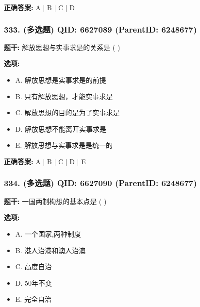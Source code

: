 \documentclass[12pt,UTF8]{ctexart}
\begin{document}
\textbf{正确答案:}
A | B | C | D

\vspace{0.3em}\hrulefill\vspace{0.7em}

\subsubsection*{333. (多选题) \small QID: 6627089 (ParentID: 6248677)}

\textbf{题干:}
解放思想与实事求是的关系是 ( )



\textbf{选项:}
\begin{itemize}[leftmargin=*]

  \item A. 解放思想是实事求是的前提

  \item B. 只有解放思想，才能实事求是

  \item C. 解放思想的目的是为了实事求是

  \item D. 解放思想不能离开实事求是

  \item E. 解放思想与实事求是是统一的

\end{itemize}

\textbf{正确答案:}
A | B | C | D | E

\vspace{0.3em}\hrulefill\vspace{0.7em}

\subsubsection*{334. (多选题) \small QID: 6627090 (ParentID: 6248677)}

\textbf{题干:}
一国两制构想的基本点是  ( )



\textbf{选项:}
\begin{itemize}[leftmargin=*]

  \item A. 一个国家,两种制度

  \item B. 港人治港和澳人治澳

  \item C. 高度自治

  \item D. 50年不变

  \item E. 完全自治

\end{itemize}
\end{document}
